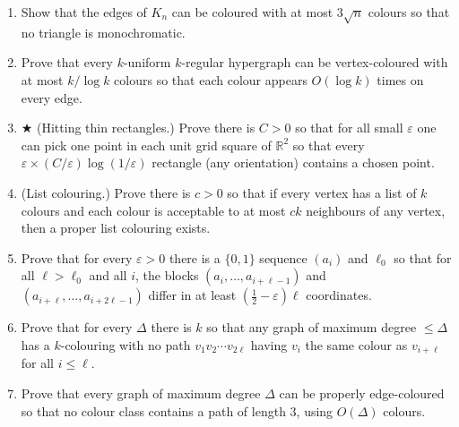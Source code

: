 \begin{enumerate}[itemsep=4pt]
  \item Show that the edges of $K_n$ can be coloured with at most $3\sqrt n$
        colours so that no triangle is monochromatic.
  \item Prove that every $k$-uniform $k$-regular hypergraph can be vertex-coloured
        with at most $k/\log k$ colours so that each colour appears $O(\log k)$
        times on every edge.
  \item $\bigstar$ (Hitting thin rectangles.) Prove there is $C>0$ so that for all
        small $\varepsilon$ one can pick one point in each unit grid square of
        $\mathbb R^2$ so that every $\varepsilon\times(C/\varepsilon)\log(1/\varepsilon)$
        rectangle (any orientation) contains a chosen point.
  \item (List colouring.) Prove there is $c>0$ so that if every vertex has a list
        of $k$ colours and each colour is acceptable to at most $ck$ neighbours of
        any vertex, then a proper list colouring exists.
  \item Prove that for every $\varepsilon>0$ there is a $\{0,1\}$ sequence
        $(a_i)$ and $\ell_0$ so that for all $\ell>\ell_0$ and all $i$, the blocks
        $(a_i,\dots,a_{i+\ell-1})$ and $(a_{i+\ell},\dots,a_{i+2\ell-1})$ differ in
        at least $(\tfrac12-\varepsilon)\ell$ coordinates.
  \item Prove that for every $\Delta$ there is $k$ so that any graph of maximum
        degree $\le\Delta$ has a $k$-colouring with no path
        $v_1v_2\cdots v_{2\ell}$ having $v_i$ the same colour as $v_{i+\ell}$ for
        all $i\le\ell$.
  \item Prove that every graph of maximum degree $\Delta$ can be properly
        edge-coloured so that no colour class contains a path of length $3$, using
        $O(\Delta)$ colours.
\end{enumerate}
